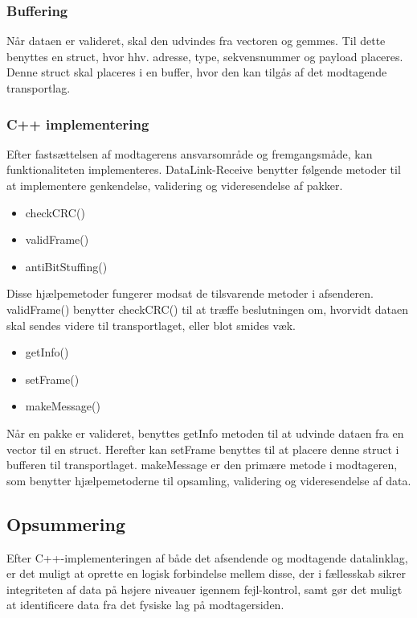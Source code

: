 \subsubsection{Buffering}
Når dataen er valideret, skal den udvindes fra vectoren og gemmes. Til dette benyttes en struct, hvor hhv. adresse, type, sekvensnummer og payload placeres. Denne struct skal placeres i en buffer, hvor den kan tilgås af det modtagende transportlag.

\subsubsection{C++ implementering}
Efter fastsættelsen af modtagerens ansvarsområde og fremgangsmåde, kan funktionaliteten implementeres.
	DataLink-Receive benytter følgende metoder til at implementere genkendelse, validering og videresendelse af pakker.

\begin{itemize}[noitemsep]
  \item checkCRC()
  \item validFrame()
  \item antiBitStuffing()
  \end{itemize}
Disse hjælpemetoder fungerer modsat de tilsvarende metoder i afsenderen. validFrame() benytter checkCRC() til at træffe beslutningen om, hvorvidt dataen skal sendes videre til transportlaget, eller blot smides væk.

\begin{itemize}[noitemsep]
  \item getInfo()
  \item setFrame()
  \item makeMessage()
  \end{itemize}
  
Når en pakke er valideret, benyttes getInfo metoden til at udvinde dataen fra en vector til en struct. Herefter kan setFrame benyttes til at placere denne struct i bufferen til transportlaget.
makeMessage er den primære metode i modtageren, som benytter hjælpemetoderne til opsamling, validering og videresendelse af data.

\subsection{Opsummering}
Efter C++-implementeringen af både det afsendende og modtagende datalinklag, er det muligt at oprette en logisk forbindelse mellem disse, der i fællesskab sikrer integriteten af data på højere niveauer igennem fejl-kontrol, samt gør det muligt at identificere data fra det fysiske lag på modtagersiden.

